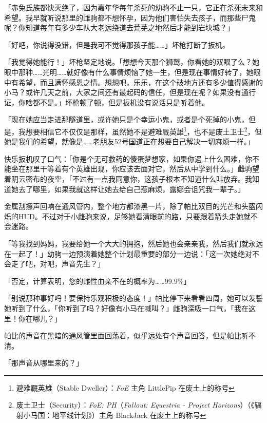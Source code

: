 「赤兔氏族都快灭绝了，因为嘉年华每年杀死的幼驹不止一只，它正在杀死未来和希望。我早就听说那里的雌驹都不想怀孕，因为他们害怕失去孩子，而那些尸鬼呢？你知道每年有多少车队大老远绕道去荒芜之地然后才能到岩块城？」

「好吧，你说得没错，但是我可不觉得那孩子能……」坏枪打断了扳机。

「我觉得她能行！」坏枪坚定地说。「想想今天那个狮鹫，你看她的双眼了么？她眼中那种……光明……就好像有什么事情烦恼了她一生，但是现在事情好转了，她眼中有希望，而且满怀感恩之情。想想吧，乐乐，在这个破地方还有多少值得感谢的小马？或许几天之前，大家之间还有最起码的信任，但是现在呢？如果没有通行证，你啥都不是。」坏枪顿了顿，但是扳机没有说话只是听着他。

「现在她应当走进那隧道里，或许她只是个幸运小鬼，或者是个死掉的小鬼，但是，我想要相信它不仅仅是那样，虽然她不是避难厩英雄\footnote{避难厩英雄（Stable Dweller）：\emph{FoE} 主角 LittlePip 在废土上的称号}，也不是废土卫士\footnote{废土卫士（Security）：\emph{FoE: PH}（\emph{Fallout: Equestria - Project Horizons}）（《辐射小马国：地平线计划》）主角 BlackJack 在废土上的称号}，但她是我们的希望，就像是……老朋友52号国道正在想要自己解决一切麻烦一样。」

快乐扳机叹了口气：「你是个无可救药的傻蛋梦想家，如果你遇上什么困难，你不能坐在那里干等着有个英雄出现，你应该去面对它，然后从中学到什么。」雌驹望着阴云密布的夜空，「不过有一点我同意你，这孩子根本不知道什么叫放弃。我知道她去了哪里，如果我就这样让她去给自己惹麻烦，露娜会诅咒我一辈子。」

\horizonline


金属刮擦声回响在通风管内，整个地方都漆黑一片，除了帕比双目的光芒和头盔闪烁的HUD。不过对于小雌驹来说，足够她看清眼前的路，只要跟着箭头走她就不会迷路。

「等我找到妈妈，我要给她一个大大的拥抱，然后她也会亲亲我，然后我们就永远在一起了！」幼驹一边预演着她整个计划最重要的部分一边说：「这一次她绝对不会走了吧，对吧，声音先生？」

「{\mt 否定，计算表明，您的雌性血亲不在的概率为……99.9\%}」

「别说那种事好吗！要保持乐观积极的态度！」帕比停下来看看四周，她可以发誓她听到了什么，「你听到了吗？好像有小马在喊叫？」雌驹深吸一口气，「我在这里！你在哪儿？」

帕比的声音在黑暗的通风管里面回荡着，似乎远处有个声音回答，但是帕比听不清。

「那声音从哪里来的？」

